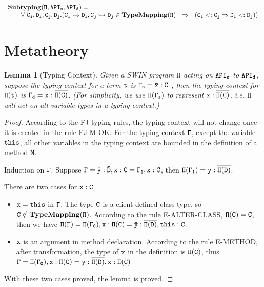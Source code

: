 \documentclass[letterpaper]{article}
\newtheorem{lemma}{Lemma}
\begin{document}
\[\begin{array}{ll}
\tt \mathbf{Subtyping}\tt(\Pi, API_s, API_d) = \\
\qquad                      \tt\forall~C_i,D_i,C_j,D_j.( C_i\hookrightarrow D_i, C_j\hookrightarrow D_j \in \mathbf{TypeMapping}(\Pi) ~~\Rightarrow~~ (C_i <: C_j\Rightarrow D_i<:D_j))
\end{array}
\]

\section{Metatheory}
\begin{lemma}[Typing Context]
Given a SWIN program $\tt\Pi$ acting on $\tt API_s$ to $\tt API_d$, suppose the typing context for a term $\tt t$ is $\tt\Gamma_s = \bar{x}:\bar{C}$ , then the typing context for $\tt\Pi(t)$ is $\tt\Gamma_d=\bar{x}:\overline{\Pi(C)}$. (For simplicity, we use $\tt \Pi(\Gamma_s)$ to represent $\tt \bar{x}:\overline{\Pi(C)}$, i.e. $\tt\Pi$ will act on all variable types in a typing context.)
\end{lemma}
\begin{proof}
According to the FJ typing rules, the typing context will not change once it is created in the rule FJ-M-OK. For the typing context $\tt\Gamma$, except the variable $\tt this$,  all other variables in the typing context are bounded in the definition of a method $\tt M$.

Induction on $\tt\Gamma$. Suppose $\tt\Gamma = \bar{y}:\bar{D}, x:C = \Gamma_1, x:C$, then $\tt\Pi(\Gamma_1)=\bar{y}:\overline{\Pi(D)}$.

There are two cases for $\tt x:C$
\begin{itemize}
\item $\tt x=this$ in $\tt\Gamma$. The type $\tt C$ is a client defined class type, so $\tt C\notin \mathbf{TypeMapping}(\Pi)$. According to the rule E-ALTER-CLASS, $\tt \Pi(C)=C$, then we have $\tt\Pi(\Gamma)=\Pi(\Gamma_0), x:\Pi(C) = \bar{y}:\overline{\Pi(D)}, this:C$.
\item $\tt x$ is an argument in method declaration. According to the rule E-METHOD, after transformation, the type of $\tt x$ in the definition is $\tt\Pi(C)$, thus $\tt\Gamma=\Pi(\Gamma_0), x:\Pi(C) = \bar{y}:\overline{\Pi(D)}, x:\Pi(C)$. 
\end{itemize}

With these two cases proved, the lemma is proved.
\end{proof}
\end{document}
